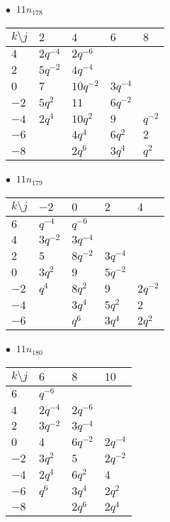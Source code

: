 \begin{minipage}{\linewidth}
$\bullet\ $ $11n_{178}$ \vspace{0.5em} \\
\begin{tabular}{l|llll}
$k \setminus j$ & $2$ & $4$ & $6$ & $8$ \\
\hline
$4$ & $2q^{-4}$ & $2q^{-6}$ &  &  \\
$2$ & $5q^{-2}$ & $4q^{-4}$ &  &  \\
$0$ & $7$ & $10q^{-2}$ & $3q^{-4}$ &  \\
$-2$ & $5q^{2}$ & $11$ & $6q^{-2}$ &  \\
$-4$ & $2q^{4}$ & $10q^{2}$ & $9$ & $q^{-2}$ \\
$-6$ &  & $4q^{4}$ & $6q^{2}$ & $2$ \\
$-8$ &  & $2q^{6}$ & $3q^{4}$ & $q^{2}$ \\
\end{tabular}
\vspace{2em}
\end{minipage}
%
\begin{minipage}{\linewidth}
$\bullet\ $ $11n_{179}$ \vspace{0.5em} \\
\begin{tabular}{l|llll}
$k \setminus j$ & $-2$ & $0$ & $2$ & $4$ \\
\hline
$6$ & $q^{-4}$ & $q^{-6}$ &  &  \\
$4$ & $3q^{-2}$ & $3q^{-4}$ &  &  \\
$2$ & $5$ & $8q^{-2}$ & $3q^{-4}$ &  \\
$0$ & $3q^{2}$ & $9$ & $5q^{-2}$ &  \\
$-2$ & $q^{4}$ & $8q^{2}$ & $9$ & $2q^{-2}$ \\
$-4$ &  & $3q^{4}$ & $5q^{2}$ & $2$ \\
$-6$ &  & $q^{6}$ & $3q^{4}$ & $2q^{2}$ \\
\end{tabular}
\vspace{2em}
\end{minipage}
%
\begin{minipage}{\linewidth}
$\bullet\ $ $11n_{180}$ \vspace{0.5em} \\
\begin{tabular}{l|lll}
$k \setminus j$ & $6$ & $8$ & $10$ \\
\hline
$6$ & $q^{-6}$ &  &  \\
$4$ & $2q^{-4}$ & $2q^{-6}$ &  \\
$2$ & $3q^{-2}$ & $3q^{-4}$ &  \\
$0$ & $4$ & $6q^{-2}$ & $2q^{-4}$ \\
$-2$ & $3q^{2}$ & $5$ & $2q^{-2}$ \\
$-4$ & $2q^{4}$ & $6q^{2}$ & $4$ \\
$-6$ & $q^{6}$ & $3q^{4}$ & $2q^{2}$ \\
$-8$ &  & $2q^{6}$ & $2q^{4}$ \\
\end{tabular}
\vspace{2em}
\end{minipage}

